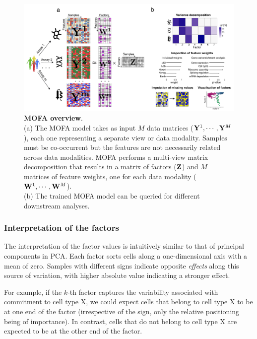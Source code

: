 \begin{figure}[H]
	\begin{center}
		\includegraphics[width=1.0\textwidth]{MOFA}
		\caption{\textbf{MOFA overview}.\\
		(a) The MOFA model takes as input $M$ data matrices (${\bf Y}^1, \cdots, {\bf Y}^M$), each one representing a separate view or data modality. Samples must be co-occurrent but the features are not necessarily related across data modalities. MOFA performs a multi-view matrix decomposition that results in a matrix of factors (${\bf Z}$) and $M$ matrices of feature weights, one for each data modality (${\bf W}^1, \cdots, {\bf W}^M$).\\
		(b) The trained MOFA model can be queried for different downstream analyses.}
		\label{fig:MOFA}
	\end{center}
\end{figure}

\subsubsection{Interpretation of the factors} \label{section:interpretation_factors}

The interpretation of the factor values is intuitively similar to that of principal components in PCA. Each factor sorts cells along a one-dimensional axis with a mean of zero. Samples with different signs indicate opposite \textit{effects} along this source of variation, with higher absolute value indicating a stronger effect.

For example, if the $k$-th factor captures the variability associated with commitment to cell type X, we could expect cells that belong to cell type X to be at one end of the factor (irrespective of the sign, only the relative positioning being of importance). In contrast, cells that do not belong to cell type X are expected to be at the other end of the factor.

